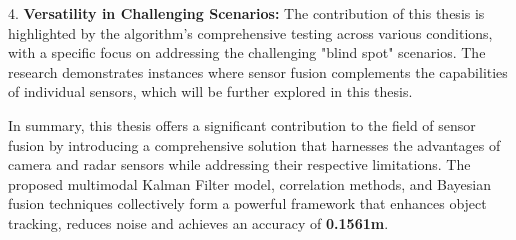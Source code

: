4. \textbf{Versatility in Challenging Scenarios: }
The contribution of this thesis is highlighted by the algorithm's comprehensive testing across various conditions, 
with a specific focus on addressing the challenging "blind spot" scenarios. 
The research demonstrates instances where sensor fusion complements the capabilities of individual sensors, 
which will be further explored in this thesis.

In summary, this thesis offers a significant contribution to the field of sensor fusion by introducing a comprehensive solution 
that harnesses the advantages of camera and radar sensors while addressing their respective limitations.
The proposed multimodal Kalman Filter model, correlation methods, and Bayesian fusion techniques collectively form 
a powerful framework that enhances object tracking, reduces noise and achieves an accuracy of \textbf{0.1561m}.